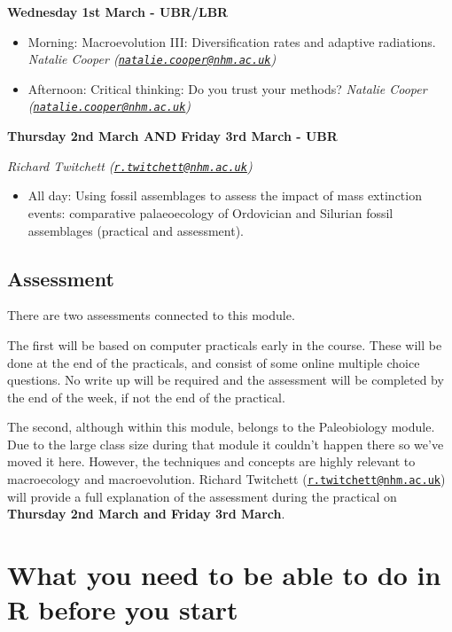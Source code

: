 \documentclass[]{book}
\providecommand{\tightlist}{%
  \setlength{\itemsep}{0pt}\setlength{\parskip}{0pt}}
\begin{document}
\textbf{Wednesday 1st March - UBR/LBR}

\begin{itemize}
\item
  Morning: Macroevolution III: Diversification rates and adaptive
  radiations. \emph{Natalie Cooper
  (\href{mailto:natalie.cooper@nhm.ac.uk}{\nolinkurl{natalie.cooper@nhm.ac.uk}})}
\item
  Afternoon: Critical thinking: Do you trust your methods? \emph{Natalie
  Cooper
  (\href{mailto:natalie.cooper@nhm.ac.uk}{\nolinkurl{natalie.cooper@nhm.ac.uk}})}
\end{itemize}

\textbf{Thursday 2nd March AND Friday 3rd March - UBR}

\emph{Richard Twitchett
(\href{mailto:r.twitchett@nhm.ac.uk}{\nolinkurl{r.twitchett@nhm.ac.uk}})}

\begin{itemize}
\tightlist
\item
  All day: Using fossil assemblages to assess the impact of mass
  extinction events: comparative palaeoecology of Ordovician and
  Silurian fossil assemblages (practical and assessment).
\end{itemize}

\section{Assessment}\label{assessment}

There are two assessments connected to this module.

The first will be based on computer practicals early in the course.
These will be done at the end of the practicals, and consist of some
online multiple choice questions. No write up will be required and the
assessment will be completed by the end of the week, if not the end of
the practical.

The second, although within this module, belongs to the Paleobiology
module. Due to the large class size during that module it couldn't
happen there so we've moved it here. However, the techniques and
concepts are highly relevant to macroecology and macroevolution. Richard
Twitchett
(\href{mailto:r.twitchett@nhm.ac.uk}{\nolinkurl{r.twitchett@nhm.ac.uk}})
will provide a full explanation of the assessment during the practical
on \textbf{Thursday 2nd March and Friday 3rd March}.

\chapter{What you need to be able to do in R before you
start}\label{what-you-need-to-be-able-to-do-in-r-before-you-start}
\end{document}
